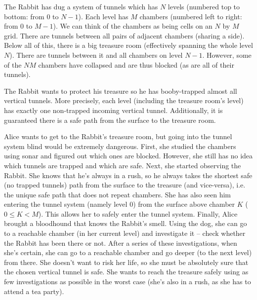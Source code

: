 \documentclass[12pt]{article}
\begin{document}
\renewcommand{\headerLang}{English}
\renewcommand{\problemName}{A11. Tunnels}

\renewcommand{\headerLeft}{IATI Day 1, Senior group}
\renewcommand{\headerRightFirst}{XVI INTERNATIONAL ADVANCED TOURNAMENT IN INFORMATICS}
\renewcommand{\headerRightSecond}{SHUMEN 2025}

\renewcommand{\tl}{$1.25$ s}
\renewcommand{\ml}{$1024$ MB}
\problem{Task \problemName}

The Rabbit has dug a system of tunnels which has $N$ levels (numbered top to bottom: from $0$ to $N-1$). Each level has $M$ chambers (numbered left to right: from $0$ to $M-1$). We can think of the chambers as being cells on an $N$ by $M$ grid. There are tunnels between all pairs of adjacent chambers (sharing a side). Below all of this, there is a big treasure room (effectively spanning the whole level $N$). There are tunnels between it and all chambers on level $N-1$. However, some of the $NM$ chambers have collapsed and are thus blocked (as are all of their tunnels).

The Rabbit wants to protect his treasure so he has booby-trapped almost all vertical tunnels. More precisely, each level (including the treasure room's level) has exactly one non-trapped incoming vertical tunnel. Additionally, it is guaranteed there is a safe path from the surface to the treasure room.

Alice wants to get to the Rabbit's treasure room, but going into the tunnel system blind would be extremely dangerous. First, she studied the chambers using sonar and figured out which ones are blocked. However, she still has no idea which tunnels are trapped and which are safe. Next, she started observing the Rabbit. She knows that he's always in a rush, so he always takes the shortest safe (no trapped tunnels) path from the surface to the treasure (and vice-versa), i.e. the unique safe path that does not repeat chambers. She has also seen him entering the tunnel system (namely level $0$) from the surface above chamber $K$ ($0 \leq K < M$). This allows her to safely enter the tunnel system. Finally, Alice brought a bloodhound that knows the Rabbit's smell. Using the dog, she can go to a reachable chamber (in her current level) and investigate it -- check whether the Rabbit has been there or not. After a series of these investigations, when she's certain, she can go to a reachable chamber and go deeper (to the next level) from there. She doesn't want to risk her life, so she must be absolutely sure that the chosen vertical tunnel is safe. She wants to reach the treasure safely using as few investigations as possible in the worst case (she's also in a rush, as she has to attend a tea party).
\end{document}
